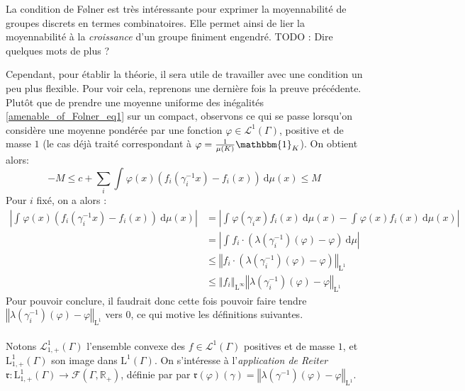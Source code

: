 \documentclass[a4paper,12pt]{article}
\newcommand{\R}{\mathbb{R}}
\newcommand{\norm}[1]{\left\Vert #1\right\Vert}
\newcommand{\abs}[1]{\left\vert#1\right\vert}
\newcommand{\indic}{\mathbbm{1}}
\newcommand{\integral}[4]{\int_{#1}^{#2} #3~\mathrm{d}#4}
\newcommand{\inv}{^{-1}}
\newcommand{\TODO}[1]{{\color{red}TODO :} #1}
\begin{document}
La condition de F\o{}lner est très intéressante pour exprimer la moyennabilité de groupes discrets en termes combinatoires. Elle permet ainsi 
de lier la moyennabilité à la \emph{croissance} d'un groupe finiment engendré. \TODO{Dire quelques mots de plus ?} 

Cependant, pour établir la théorie, il sera utile de travailler avec une condition un peu plus flexible. Pour voir cela, reprenons une dernière fois la preuve
précédente. Plutôt que de prendre une moyenne uniforme des inégalités \ref{amenable_of_Folner_eq1} sur un compact, observons ce qui se passe 
lorsqu'on considère une moyenne pondérée par une fonction $\varphi\in\mathscr{L}^1(\Gamma)$, positive et de masse $1$ (le cas déjà traité correspondant à $\varphi=\frac1{\mu(K)}\indic_K$).
On obtient alors:
\begin{equation*}\label{intuition_Reiter_eq1}
    -M \le c + \sum_i \integral{}{}{\varphi(x)\left(f_i(\gamma_i\inv x) - f_i(x)\right)}{\mu(x)} \le M
\end{equation*}
Pour $i$ fixé, on a alors :
\begin{align*}
    \abs{\integral{}{}{\varphi(x)(f_i(\gamma_i\inv x) - f_i(x))}{\mu(x)}} 
        &= \abs{\integral{}{}{\varphi(\gamma_i x)f_i(x)}{\mu(x)} - \integral{}{}{\varphi(x) f_i(x)}{\mu(x)}} \\
        &= \abs{\integral{}{}{f_i\cdot\left(\lambda(\gamma_i\inv)(\varphi)-\varphi\right)}{\mu}} \\
        &\le \norm{f_i\cdot\left(\lambda(\gamma_i\inv)(\varphi)-\varphi\right)}_{\mathrm{L}^1} \\
        &\le \norm{f_i}_{\mathrm{L}^\infty} \norm{\lambda(\gamma_i\inv)(\varphi)-\varphi}_{\mathrm{L}^1}
\end{align*}
Pour pouvoir conclure, il faudrait donc cette fois pouvoir faire tendre $\norm{\lambda(\gamma_i\inv)(\varphi)-\varphi}_{\mathrm{L}^1}$ vers $0$, ce qui motive les définitions suivantes.

\paragraph{}

Notons $\mathscr{L}^1_{1,+}(\Gamma)$ l'ensemble convexe des $f\in\mathscr{L}^1(\Gamma)$ positives et de masse $1$, et $\mathrm{L}^1_{1, +}(\Gamma)$ son image dans 
$\mathrm{L}^1(\Gamma)$. On s'intéresse à l'\emph{application de Reiter} $\mathfrak{r} : \mathrm{L}^1_{1, +}(\Gamma)\to\mathcal{F}(\Gamma, \R_+)$, définie par
par $\mathfrak{r}(\varphi)(\gamma) = \norm{\lambda(\gamma\inv)(\varphi)-\varphi}_{\mathrm{L}^1}$.
\end{document}

